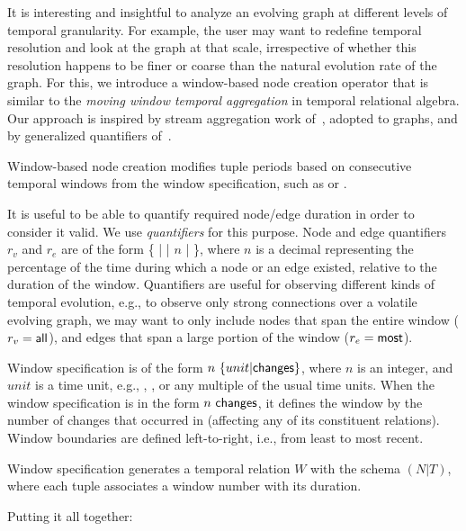 It is interesting and insightful to analyze an evolving graph at
different levels of temporal granularity.  For example, the user may
want to redefine temporal resolution and look at the graph at that
scale, irrespective of whether this resolution happens to be finer or
coarse than the natural evolution rate of the graph.  For this, we
introduce a window-based node creation operator that is similar to the
{\em moving window temporal aggregation} in temporal relational
algebra.  Our approach is inspired by stream aggregation work
of~\cite{Li2005}, adopted to graphs, and by generalized quantifiers
of~\cite{Hsu1995}.

Window-based node creation modifies tuple periods based on consecutive
temporal windows from the window specification, such as  or .

It is useful to be able to quantify required node/edge duration in
order to consider it valid.  We use {\em quantifiers} for this
purpose.  Node and edge quantifiers $r_v$ and $r_e$ are of the form \{
 |  |  $n$ |  \},
where $n$ is a decimal representing the percentage of the time during
which a node or an edge existed, relative to the duration of the
window.  Quantifiers are useful for observing different kinds of
temporal evolution, e.g., to observe only strong connections over a
volatile evolving graph, we may want to only include nodes that span
the entire window ($r_v=\textsf{all}$), and edges that span a large
portion of the window ($r_e=\textsf{most}$).

Window specification is of the form $n~\{unit|\textsf{changes}\}$,
where $n$ is an integer, and $unit$ is a time unit, e.g., , , or any multiple of the usual time units.
When the window specification is in the form $n~\textsf{changes}$, it
defines the window by the number of changes that occurred in \ttt
(affecting any of its constituent relations). Window boundaries are
defined left-to-right, i.e., from least to most recent.

Window specification generates a temporal relation $W$ with the schema
$(N|T)$, where each tuple associates a window number with its
duration.

Putting it all together:

